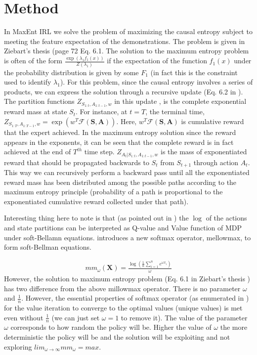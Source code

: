 \documentclass{article}[11pt]
\begin{document}
\section{Method}
In MaxEnt IRL we solve the problem of maximizing the causal entropy subject to meeting the feature expectation of the demonstrations. The problem is given in Ziebart's thesis \cite{ziebart2010modeling} (page 72 Eq. 6.1. The solution to the maximum entropy problem is often of the form $\frac{\exp(\lambda_1f_1(x))}{Z(\lambda_1)}$ if the expectation of the function $f_1(x)$ under the probability distribution is given by some $F_1$ (in fact this is the constraint used to identify $\lambda_1$). For this problem, since the causal entropy involves a series of products, we can express the solution through a recursive update (Eq. 6.2 in \cite{ziebart2010modeling}). The partition functions $Z_{S_{1:t}, A_{1:t-1}, w}$ in this update , is the complete exponential reward mass at state $S_t$. For instance, at $t=T$, the terminal time, $Z_{S_{1:T}, A_{1:T-1}, w} = \exp(w^T\mathcal{F}(\textbf{S}, \textbf{A}))$. Here, $w^T\mathcal{F}(\textbf{S}, \textbf{A})$ is cumulative reward that the expert achieved. In the maximum entropy solution since the reward appears in the exponents, it can be seen that the complete reward is in fact achieved at the end of $T^{th}$ time step. $Z_{A_t|S_{1:t}, A_{1:t-1}, w}$ is the mass of exponentiated reward that should be propagated backwards to $S_t$ from $S_{t+1}$ through action $A_{t}$. This way we can recursively perform a backward pass until all the exponentiated reward mass has been distributed among the possible paths according to the maximum entropy principle (probability of a path is proportional to the exponentiated cumulative reward collected under that path).  

Interesting thing here to note is that (as pointed out in \cite{ziebart2010modeling}) the $\log$ of the actions and state partitions can be interpreted as Q-value and Value function of MDP under soft-Bellamn equations. \cite{asadi2016new} introduces a new softmax operator, mellowmax,  to form soft-Bellman equations. 

\begin{align}
mm_\omega(\textbf{X}) = \frac{\log( \frac{1}{n} \sum_{i=1}^n e^{\omega x_i})}{\omega}
\end{align}
However, the solution to maximum entropy problem (Eq. 6.1 in Ziebart's thesis \cite{ziebart2010modeling}) has two difference from the above millowmax operator. There is no parameter $\omega$ and $\frac{1}{n}$. However, the essential properties of softmax operator (as enumerated in \cite{asadi2016new}) for the value iteration to converge to the optimal values (unique values) is met even without $\frac{1}{n}$ (we can just set $\omega =1$ to remove it). The value of the parameter $\omega$ corresponds to how random the policy will be. Higher the value of $\omega$ the more deterministic the policy will be and the solution will be exploiting and not exploring $lim_{\omega \to \infty} mm_\omega = max$. 
\end{document}
